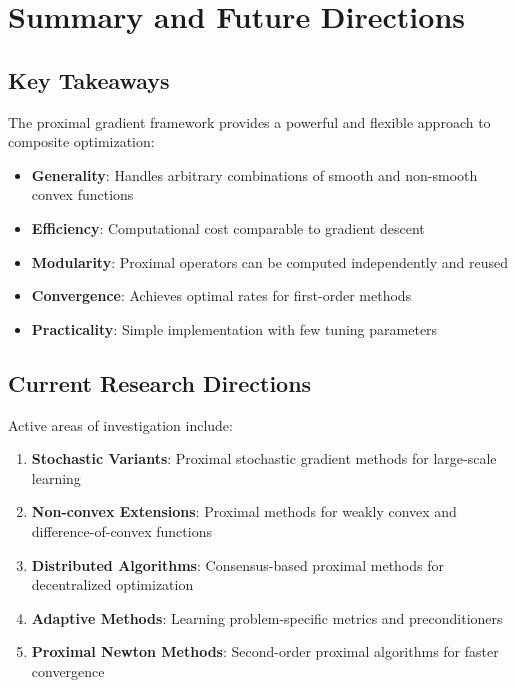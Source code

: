 \documentclass[12pt]{article}
\theoremstyle{definition}
\begin{document}
\newpage
\section{Summary and Future Directions}

\subsection{Key Takeaways}

The proximal gradient framework provides a powerful and flexible approach to composite optimization:

\begin{itemize}[leftmargin=*]
    \item \textbf{Generality}: Handles arbitrary combinations of smooth and non-smooth convex functions
    \item \textbf{Efficiency}: Computational cost comparable to gradient descent
    \item \textbf{Modularity}: Proximal operators can be computed independently and reused
    \item \textbf{Convergence}: Achieves optimal rates for first-order methods
    \item \textbf{Practicality}: Simple implementation with few tuning parameters
\end{itemize}

\subsection{Current Research Directions}

Active areas of investigation include:

\begin{enumerate}
    \item \textbf{Stochastic Variants}: Proximal stochastic gradient methods for large-scale learning
    \item \textbf{Non-convex Extensions}: Proximal methods for weakly convex and difference-of-convex functions
    \item \textbf{Distributed Algorithms}: Consensus-based proximal methods for decentralized optimization
    \item \textbf{Adaptive Methods}: Learning problem-specific metrics and preconditioners
    \item \textbf{Proximal Newton Methods}: Second-order proximal algorithms for faster convergence
\end{enumerate}
\end{document}
